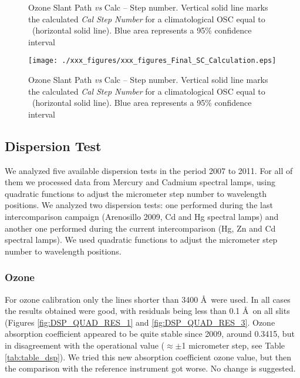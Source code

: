 \begin{figure}[hbtp!]
\begin{center}

{%
  \caption{Ozone Slant Path \emph{vs} Calc -- Step number. Vertical solid line marks the calculated \emph{Cal Step Number} for a climatological OSC equal to \textbf{\STATIONOSC}\ (horizontal solid line). Blue area represents a 95\% confidence interval}
\label{fig:Final_SC_Calculation}
}
{%
\texttt{[image: ./xxx\_figures/xxx\_figures\_Final\_SC\_Calculation.eps]}
  \caption{Ozone Slant Path \emph{vs} Calc -- Step number. Vertical solid line marks the calculated \emph{Cal Step Number} for a climatological OSC equal to \textbf{\STATIONOSC}\ (horizontal solid line). Blue area represents a 95\% confidence interval}
\label{fig:Final_SC_Calculation}
}

\end{center}
\end{figure}

\subsection{Dispersion Test} \label{subsec:DSP}
We analyzed five available dispersion tests in the period 2007 to 2011. For all of them we processed data from Mercury and Cadmium spectral lamps, using quadratic functions to adjust the micrometer step number to wavelength positions.
We analyzed two dispersion tests: one performed during the last intercomparison campaign (Arenosillo 2009, Cd and Hg spectral lamps) and another one performed during the current intercomparison (Hg, Zn and Cd  spectral lamps). We used quadratic functions to adjust the micrometer step number to wavelength positions.


\subsubsection{Ozone}
For ozone calibration only the lines shorter than 3400 \AA\ were used. In all cases the results obtained were good, with residuals being less than 0.1 \AA\ on all slits (Figures \ref{fig:DSP_QUAD_RES_1} and \ref{fig:DSP_QUAD_RES_3}. Ozone absorption coefficient appeared to be quite stable since 2009, around 0.3415, but in disagreement with the operational value ($\approx\pm$1 micrometer step, see Table \ref{tab:table_dsp}). We tried this new absorption coefficient ozone value, but then the comparison with the reference instrument got worse. No change is suggested.

